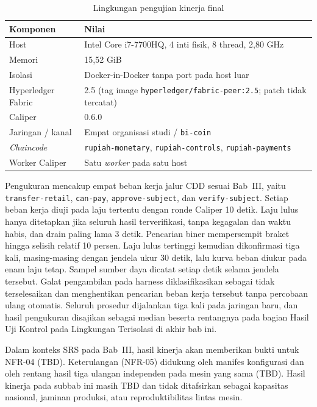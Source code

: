 \begin{table}[H]
\caption{Lingkungan pengujian kinerja final}
\label{tab:lingkungan-kinerja-final}
\centering
\scriptsize
\begin{tabular}{@{}ll@{}}
\toprule
\textbf{Komponen} & \textbf{Nilai} \\
\midrule
Host & Intel Core i7-7700HQ, 4 inti fisik, 8 thread, 2,80 GHz \\
Memori & 15,52 GiB \\
Isolasi & Docker-in-Docker tanpa port pada host luar \\
Hyperledger Fabric & 2.5 (tag image \texttt{hyperledger/fabric-peer:2.5}; patch tidak tercatat) \\
Caliper & 0.6.0 \\
Jaringan / kanal & Empat organisasi studi / \texttt{bi-coin} \\
\textit{Chaincode} & \texttt{rupiah-monetary}, \texttt{rupiah-controls}, \texttt{rupiah-payments} \\
Worker Caliper & Satu \textit{worker} pada satu host \\
\bottomrule
\end{tabular}
\end{table}

Pengukuran mencakup empat beban kerja jalur CDD sesuai Bab~III, yaitu
\texttt{transfer-retail}, \texttt{can-pay}, \texttt{approve-subject}, dan
\texttt{verify-subject}. Setiap beban kerja diuji pada laju tertentu dengan
ronde Caliper 10 detik. Laju lulus hanya ditetapkan jika seluruh hasil
terverifikasi, tanpa kegagalan dan waktu habis, dan drain paling lama 3 detik.
Pencarian biner mempersempit braket hingga selisih relatif 10 persen. Laju
lulus tertinggi kemudian dikonfirmasi tiga kali, masing-masing dengan jendela
ukur 30 detik, lalu kurva beban diukur pada enam laju tetap. Sampel sumber daya
dicatat setiap detik selama jendela tersebut. Galat pengambilan pada harness
diklasifikasikan sebagai tidak terselesaikan dan menghentikan pencarian beban
kerja tersebut tanpa percobaan ulang otomatis. Seluruh prosedur dijalankan tiga
kali pada jaringan baru, dan hasil pengukuran disajikan sebagai median beserta
rentangnya pada bagian Hasil Uji Kontrol pada Lingkungan Terisolasi di akhir
bab ini.







Dalam konteks SRS pada Bab~III, hasil kinerja akan memberikan bukti untuk NFR-04 (TBD).
Keterulangan (NFR-05) didukung oleh manifes konfigurasi dan oleh rentang hasil
tiga ulangan independen pada mesin yang sama (TBD). Hasil kinerja pada subbab ini masih TBD dan tidak
ditafsirkan sebagai kapasitas nasional, jaminan produksi, atau reproduktibilitas
lintas mesin.


